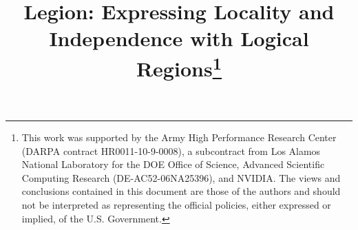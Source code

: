 \documentclass[conference]{IEEEtran}
\begin{document}
\pdfpagewidth=8.5in
\pdfpageheight=11in



\title{Legion: Expressing Locality and Independence with Logical
  Regions\thanks{This work was supported by the Army High Performance
    Research Center (DARPA contract HR0011-10-9-0008), a subcontract
    from Los Alamos National Laboratory for the DOE Office of Science,
    Advanced Scientific Computing Research (DE-AC52-06NA25396), and NVIDIA.  The views and
    conclusions contained in this document are those of the authors
    and should not be interpreted as representing the official
    policies, either expressed or implied, of the U.S. Government.}}

\author{
\and
{}
\and
{}
\and
{}
}


\maketitle
\end{document}
